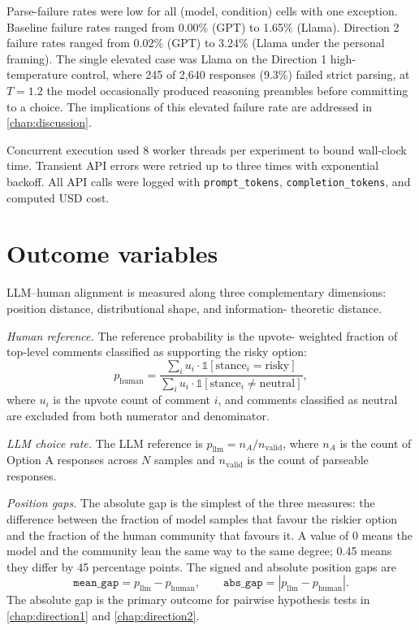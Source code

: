 Parse-failure rates were low for all (model, condition) cells with one
exception. Baseline failure rates ranged from 0.00\% (GPT) to 1.65\%
(Llama). Direction 2 failure rates ranged from 0.02\% (GPT) to 3.24\%
(Llama under the personal framing). The single elevated case was
Llama on the Direction 1 high-temperature control, where 245 of 2,640
responses (9.3\%) failed strict parsing, at $T = 1.2$ the model
occasionally produced reasoning preambles before committing to a
choice. The implications of this elevated failure rate are addressed
in \cref{chap:discussion}.

Concurrent execution used 8 worker threads per experiment to bound
wall-clock time. Transient API errors were retried up to three times
with exponential backoff. All API calls were logged with
\texttt{prompt\_tokens}, \texttt{completion\_tokens}, and computed
USD cost.

\section{Outcome variables}
\label{sec:m_outcomes}

LLM--human alignment is measured along three complementary
dimensions: position distance, distributional shape, and information-
theoretic distance.

\textit{Human reference.} The reference probability is the upvote-
weighted fraction of top-level comments classified as supporting the
risky option:
\begin{equation}
  p_{\text{human}} = \frac{\sum_i u_i \cdot \mathbb{1}[\text{stance}_i = \text{risky}]}{\sum_i u_i \cdot \mathbb{1}[\text{stance}_i \neq \text{neutral}]},
  \label{eq:m_phuman}
\end{equation}
where $u_i$ is the upvote count of comment $i$, and comments
classified as neutral are excluded from both numerator and
denominator.

\textit{LLM choice rate.} The LLM reference is
$p_{\text{llm}} = n_A / n_{\text{valid}}$, where $n_A$ is the count of
Option A responses across $N$ samples and $n_{\text{valid}}$ is the
count of parseable responses.

\textit{Position gaps.} The absolute gap is the simplest of the three
measures: the difference between the fraction of model samples that
favour the riskier option and the fraction of the human community that
favours it. A value of 0 means the model and the community lean the same
way to the same degree; 0.45 means they differ by 45 percentage points.
The signed and absolute position gaps are
\begin{equation}
  \texttt{mean\_gap} = p_{\text{llm}} - p_{\text{human}},
  \qquad
  \texttt{abs\_gap} = | p_{\text{llm}} - p_{\text{human}} |.
  \label{eq:m_gap}
\end{equation}
The absolute gap is the primary outcome for pairwise hypothesis tests
in \cref{chap:direction1} and \cref{chap:direction2}.

